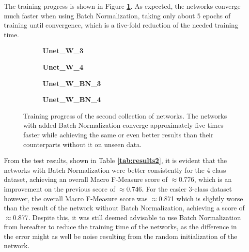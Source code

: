 The training progress is shown in Figure \textbf{\ref{fig:weighted_weighted_batchnorm_training}}. As expected, the networks converge much faster when using Batch Normalization, taking only about 5 epochs of training until convergence, which is a five-fold reduction of the needed training time.\\


\begin {figure}[!ht]
	\begin {subfigure}[b]{0.4\linewidth}
		\scalebox{0.65}{}
		\caption{\textbf{Unet\_W\_3}}
	\end {subfigure}\hspace{1.75cm}
	\begin {subfigure}[b]{0.4\linewidth}
		\scalebox{0.65}{}
		\caption{\textbf{Unet\_W\_4}}
	\end {subfigure}

	\begin {subfigure}[b]{0.4\linewidth}
		\scalebox{0.65}{}
		\caption{\textbf{Unet\_W\_BN\_3}}
	\end {subfigure}\hspace{1.75cm}
	\begin {subfigure}[b]{0.4\linewidth}
		\scalebox{0.65}{}
		\caption{\textbf{Unet\_W\_BN\_4}}
	\end {subfigure}

		\caption[Training progress of the second collection of networks.]{Training progress of the second collection of networks. The networks with added Batch Normalization converge approximately five times faster while achieving the same or even better results than their counterparts without it on unseen data.}
		\label{fig:weighted_weighted_batchnorm_training}
\end {figure}

\noindent From the test results, shown in Table \textbf{\ref{tab:results2}}, it is evident that the networks with Batch Normalization were better consistently for the 4-class dataset, achieving an overall Macro F-Measure score of $\approx$0.776, which is an improvement on the previous score of $\approx$0.746. For the easier 3-class dataset however, the overall Macro F-Measure score was $\approx$0.871 which is slightly worse than the result of the network without Batch Normalization, achieving a score of $\approx$0.877. Despite this, it was still deemed advisable to use Batch Normalization from hereafter to reduce the training time of the networks, as the difference in the error might as well be noise resulting from the random initialization of the network.\\


